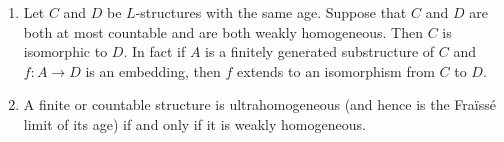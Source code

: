 \begin{lemma}
    \label{lem:weak-homogeneity-and-ultrahomogeneity}

    \leavevmode
    \begin{enumerate}[a]
        \item Let \( C \) and \( D \) be \( L \)-structures with the same age. Suppose that \( C \) and \( D \) are both at most countable and are both weakly homogeneous. Then \( C \) is isomorphic to \( D \). In fact if \( A \) is a finitely generated substructure of \( C \) and \( f\colon A \to D \) is an embedding, then \( f \) extends to an isomorphism from \( C \) to \( D \).

        \item A finite or countable structure is ultrahomogeneous (and hence is the Fraïssé limit of its age) if and only if it is weakly homogeneous.
    \end{enumerate}
\end{lemma}


